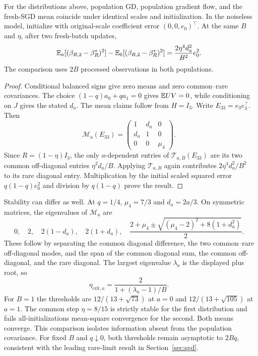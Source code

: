 \begin{proposition}
 \label{prop:matched}
 For the distributions above, population GD, population gradient flow, and the
 fresh-SGD mean coincide under identical scales and initialization. In the
 noiseless model, initialize with original-scale coefficient error
 $(0,0,e_0)^\top$. At the same $B$ and $\eta$, after two fresh-batch updates,
 \[
  \mathbb{E}_a[(\beta_{R,2} - \beta_R^*)^2] - \mathbb{E}_0[(\beta_{R,2} - \beta_R^*)^2] = \frac{2\eta^4d_a^2}{B^2}e_0^2.
 \]
 The comparison uses $2B$ processed observations in both populations.
\end{proposition}
\begin{proof}
 Conditional balanced signs give zero means and zero common--rare covariances.
 The choice $(1 - q)a_0 + qa_1 = 0$ gives $\mathbb{E} UV = 0$, while conditioning on $J$
 gives the stated $d_a$. The mean claims follow from $H = I_3$. Write
 $E_{33} = e_3e_3^\top$. Then
 \[
  \mathcal M_a(E_{33}) = \begin{pmatrix}
                          1   & d_a & 0     \\
                          d_a & 1   & 0     \\
                          0   & 0   & \mu_4
                         \end{pmatrix}.
 \]
 Since $R = (1 - \eta)I_3$, the only $a$-dependent entries of
 $\mathcal T_{a,B}(E_{33})$ are its two common off-diagonal entries
 $\eta^2d_a/B$. Applying $\mathcal T_{a,B}$ again contributes $2\eta^4d_a^2/B^2$
 to its rare diagonal entry. Multiplication by the initial scaled squared error
 $q(1 - q)e_0^2$ and division by $q(1 - q)$ prove the result.
\end{proof}

Stability can differ as well. At $q = 1/4$, $\mu_4 = 7/3$ and $d_a = 2a/3$. On
symmetric matrices, the eigenvalues of $\mathcal M_a$ are
\[
 0,\quad 2,\quad 2(1 - d_a),\quad 2(1 + d_a),\quad \frac{2 + \mu_4 \pm \sqrt{(\mu_4 - 2)^2 + 8(1 + d_a^2)}}{2}.
\]
These follow by separating the common diagonal difference, the two common--rare
off-diagonal modes, and the span of the common diagonal sum, the common
off-diagonal, and the rare diagonal. The largest eigenvalue $\lambda_a$ is the
displayed plus root, so
\[
 \eta_{\mathrm{crit},a} = \frac{2}{1 + (\lambda_a - 1)/B}.
\]
For $B = 1$ the thresholds are $12/(13 + \sqrt{73})$ at $a = 0$ and
$12/(13 + \sqrt{105})$ at $a = 1$. The common step $\eta = 8/15$ is strictly
stable for the first distribution and fails all-initializations mean-square
convergence for the second. Both means converge. This comparison isolates
information absent from the population covariance. For fixed $B$ and
$q \downarrow 0$, both thresholds remain asymptotic to $2Bq$, consistent with
the leading rare-limit result in Section~\ref{sec:sgd}.

